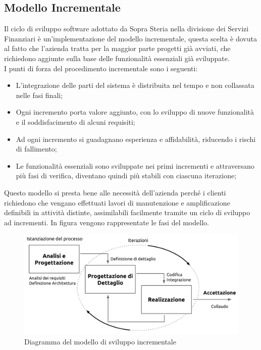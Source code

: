 	\subsection{Modello Incrementale}
	
	Il ciclo di sviluppo software adottato da Sopra Steria nella divisione dei Servizi Finanziari è un'implementazione del modello incrementale, questa scelta è dovuta al fatto che l'azienda tratta per la maggior parte progetti già avviati, che richiedono aggiunte sulla base delle funzionalità essenziali già sviluppate. \\
	
	I punti di forza del procedimento incrementale sono i seguenti:
	\begin{itemize}
		\item L'integrazione delle parti del sistema è distribuita nel tempo e non collassata nelle fasi finali;
		\item Ogni incremento porta valore aggiunto, con lo sviluppo di nuove funzionalità e il soddisfacimento di alcuni requisiti;
		\item Ad ogni incremento si guadagnano esperienza e affidabilità, riducendo i rischi di fallimento;
		\item Le funzionalità essenziali sono sviluppate nei primi incrementi e attraversano più fasi di verifica, diventano quindi più stabili con ciascuna iterazione;
	\end{itemize}
	
	Questo modello si presta bene alle necessità dell'azienda perché i clienti richiedono che vengano effettuati lavori di manutenzione e amplificazione definibili in attività distinte, assimilabili facilmente tramite un ciclo di sviluppo ad incrementi. In figura vengono rappresentate le fasi del modello.\\
	
	\begin{figure}[H]
		\centering
	   	\includegraphics[width=1\textwidth]{immagini/modello_incrementale}
	   	\caption{Diagramma del modello di sviluppo incrementale}
	\end{figure}
	\newpage
	
